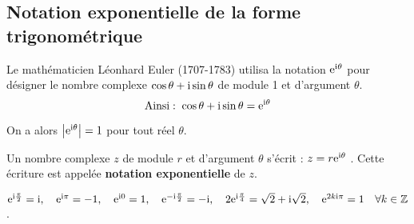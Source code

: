  \subsection*{Notation exponentielle de la  forme trigonométrique} 
 Le mathématicien Léonhard Euler (1707-1783) utilisa la notation $ \mathrm{e}^{\text{i} \theta } $ pour désigner le nombre complexe $ \cos \theta +\text{i} \sin \theta $ de module 1 et d'argument $ \theta $.
 \[\text{Ainsi}:\; \cos \theta +\text{i} \sin \theta= \mathrm{e}^{\text{i} \theta }  \]
 
 On a alors \; $ \left|\mathrm{e}^{\text{i} \theta }\right| =1$ pour tout réel $ \theta $.
 
 \medskip
 \begin{definition}
 Un nombre complexe $ z $ de module $ r $ et d'argument $ \theta $
s'écrit : $z=r \mathrm{e}^{\text{i} \theta }$ . Cette écriture est appelée  \textbf{notation exponentielle} de $ z $.
\end{definition}
 \medskip

\begin{example}
 $  \mathrm{e}^{\text{i} \frac{\pi}{2} }=\text{i} ,\quad     \mathrm{e}^{\text{i} \pi }=-1 ,\quad    \mathrm{e}^{\text{i} 0 }=1 ,\quad    \mathrm{e}^{-\text{i} \frac{\pi}{2} }=-\text{i} ,  \quad    2\mathrm{e}^{\text{i} \frac{\pi}{4} }=\sqrt{2}+ \text{i}\sqrt{2}, \quad    \mathrm{e}^{2k\text{i}\pi}=1\quad   \forall k\in\mathbb{Z}$.
 \end{example}
 
